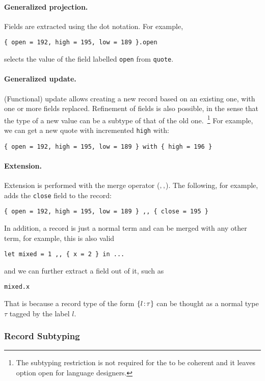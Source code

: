 {\paragraph{Generalized projection.}
Fields are extracted using the dot notation. For example,
\begin{lstlisting}
{ open = 192, high = 195, low = 189 }.open
\end{lstlisting}
selects the value of the field labelled \lstinline{open} from \lstinline{quote}.

\paragraph{Generalized update.}
(Functional) update allows creating a new record based on an existing one, with
one or more fields replaced. Refinement of fields is also possible, in the sense
that the type of a new value can be a subtype of that of the old
one.~\footnote{The subtyping restriction is not required for the \name to be
  coherent and it leaves option open for language designers.} For example, we
can get a new quote with incremented \lstinline{high} with:
\begin{lstlisting}
{ open = 192, high = 195, low = 189 } with { high = 196 }
\end{lstlisting}

\paragraph{Extension.}
Extension is performed with the merge operator ($ ,, $). The following,
for example, adds the \lstinline{close} field to the record:
\begin{lstlisting}
{ open = 192, high = 195, low = 189 } ,, { close = 195 }
\end{lstlisting}

In addition, a record is just a normal term and can be merged with any other
term, for example, this is also valid
\begin{lstlisting}
let mixed = 1 ,, { x = 2 } in ...
\end{lstlisting}
and we can further extract a field out of it, such as
\begin{lstlisting}
mixed.x
\end{lstlisting}
That is because a record type of the form $ \{ l \!:\! \tau \} $ can be thought as a
normal type $ \tau $ tagged by the label $ l $.

\subsubsection{Record Subtyping}

}
